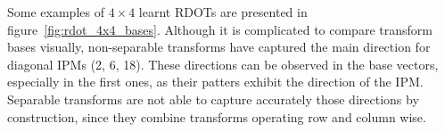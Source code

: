 \documentclass[11pt,a4paper,openright,twoside]{book}
\numberwithin{equation}{section} %
\numberwithin{figure}{section} %
\numberwithin{table}{section} %
\begin{document}
Some examples of $4\times4$ learnt \acp{RDOT} are presented in
figure~\ref{fig:rdot_4x4_bases}.
Although it is complicated to compare transform bases visually, non-separable
transforms have captured the main direction for diagonal \acp{IPM} (2, 6, 18).
These directions can be observed in the base vectors, especially in the first
ones, as their patters exhibit the direction of the \ac{IPM}.
Separable transforms are not able to capture accurately those directions by
construction, since they combine transforms operating row and column wise.

\begin{figure}[tb]
	\centering
	\hfill
	\hfill
	\hfill
	\hfill
	\\

\end{figure}
\end{document}
